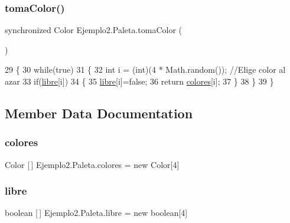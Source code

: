 \subsubsection{\texorpdfstring{toma\+Color()}{tomaColor()}}
{\footnotesize\ttfamily synchronized Color Ejemplo2.\+Paleta.\+toma\+Color (\begin{DoxyParamCaption}{ }\end{DoxyParamCaption})\hspace{0.3cm}{\ttfamily [inline]}}


\begin{DoxyCode}
29     \{
30         \textcolor{keywordflow}{while}(\textcolor{keyword}{true})
31         \{
32             \textcolor{keywordtype}{int} i = (int)(4 * Math.random());    \textcolor{comment}{//Elige color al azar}
33             \textcolor{keywordflow}{if}(\mbox{\hyperlink{class_ejemplo2_1_1_paleta_adb1708f360271b4d7c24a09aeed31f29}{libre}}[i])
34             \{
35                 \mbox{\hyperlink{class_ejemplo2_1_1_paleta_adb1708f360271b4d7c24a09aeed31f29}{libre}}[i]=\textcolor{keyword}{false};
36                 \textcolor{keywordflow}{return} \mbox{\hyperlink{class_ejemplo2_1_1_paleta_ab6636b274dbb3f89739e635922ff7a75}{colores}}[i];
37             \}
38         \}
39     \}
\end{DoxyCode}


\subsection{Member Data Documentation}
\mbox{\label{class_ejemplo2_1_1_paleta_ab6636b274dbb3f89739e635922ff7a75}} 
\subsubsection{\texorpdfstring{colores}{colores}}
{\footnotesize\ttfamily Color \mbox{[}$\,$\mbox{]} Ejemplo2.\+Paleta.\+colores = new Color\mbox{[}4\mbox{]}\hspace{0.3cm}{\ttfamily [private]}}

\mbox{\label{class_ejemplo2_1_1_paleta_adb1708f360271b4d7c24a09aeed31f29}} 
\subsubsection{\texorpdfstring{libre}{libre}}
{\footnotesize\ttfamily boolean \mbox{[}$\,$\mbox{]} Ejemplo2.\+Paleta.\+libre = new boolean\mbox{[}4\mbox{]}\hspace{0.3cm}{\ttfamily [private]}}

